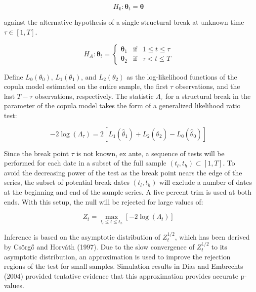 \documentclass[12pt]{article}
\begin{document}
\begin{equation}
H_{0}:\boldsymbol{\theta}_{t} = \boldsymbol{\theta}
\end{equation}

against the alternative hypothesis of a single structural break at unknown
time $\tau \in \left[1, T\right]$.

\begin{equation}
H_{A}:\boldsymbol{\theta}_{t} = \left\{
\begin{array}{ccc}
    \boldsymbol{\theta}_{1} & \text{if} & 1\leq t \leq \tau \\ 
    \boldsymbol{\theta}_{2} & \text{if} & \tau < t \leq T
\end{array}
\right. 
\end{equation}

Define $L_{0}\left(\theta_{0}\right)$, $L_{1}\left(\theta_{1}\right)$,
and $L_{2}\left(\theta_{2}\right)$ as the log-likelihood functions of
the copula model estimated on the entire sample, the first $\tau$
observations, and the last $T-\tau$ observations, respectively. The
statistic $\Lambda_{\tau}$ for a structural break in the parameter of
the copula model takes the form of a generalized likelihood ratio test:

\begin{equation}
-2\log \left(\Lambda_{\tau}\right) = 2\left[L_{1}\left(\hat{\theta}_{1}\right) + L_{2}\left(\hat{\theta}_{2}\right) - L_{0}\left(\hat{\theta}_{0}\right)\right]
\end{equation}

Since the break point $\tau$ is not known, ex ante, a sequence of tests
will be performed for each date in a subset of the full sample
$\left(t_{l},t_{h}\right) \subset \left[1, T\right]$. To avoid the
decreasing power of the test as the break point nears the edge of the
series, the subset of potential break dates $\left( t_{l},t_{h}\right)$
will exclude a number of dates at the beginning and end of the sample
series. A five percent trim is used at both ends. With this setup, the
null will be rejected for large values of:

\begin{equation}
Z_{t}=\max_{t_{l}\leq t\leq t_{h}}\left[ -2\log \left( \Lambda _{t}\right)\right]
\end{equation}

Inference is based on the asymptotic distribution of $Z_{t}^{1/2}$, which
has been derived by Cs\"{o}rg\H{o} and Horv\'{a}th (1997). Due to the slow
convergence of $Z_{t}^{1/2}$ to its asymptotic distribution, an
approximation is used to improve the rejection regions of the test for
small samples. Simulation results in Dias and Embrechts (2004) provided
tentative evidence that this approximation provides accurate p-values.
\end{document}
